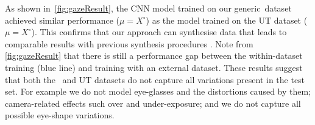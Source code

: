 As shown
in~\autoref{fig:gazeResult}, the CNN model trained on our generic~\dataset dataset achieved similar performance ($\mu\!=\!X^{\circ}$) as the model trained on the UT dataset ($\mu\!=\!X^{\circ}$). 
This confirms that our approach can synthesise data that leads to comparable results with previous synthesis procedures \cite{sugano2014learning}.
Note from \autoref{fig:gazeResult} that there is still a performance gap between the within-dataset training (blue line) and training with an external dataset.
These results suggest that both the \dataset~and UT datasets do not capture all variations present in the test set. For example we do not model eye-glasses and the distortions caused by them; camera-related effects such over and under-exposure; and we do not capture all possible eye-shape variations.


